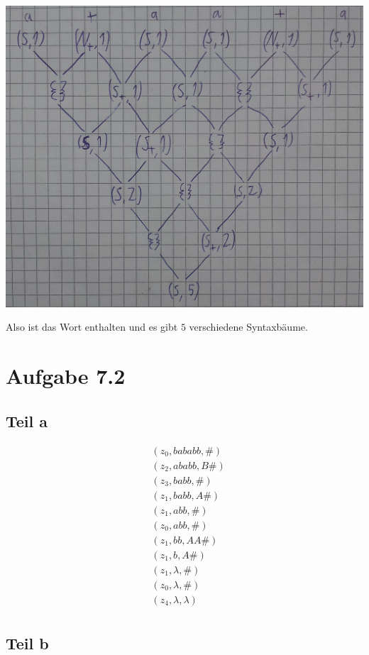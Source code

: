 \documentclass[10pt,a4paper]{article}
\begin{document}
\includegraphics[width=400pt]{7_1_b.png}

Also ist das Wort enthalten und es gibt $5$ verschiedene Syntaxbäume.

\section{Aufgabe 7.2}

\subsection{Teil a}

\begin{align*}
  & (z_{0}, bababb, \#)\\
  & (z_{2}, ababb, B\#)\\
  & (z_{3}, babb, \#)\\
  & (z_{1}, babb, A\#)\\
  & (z_{1}, abb, \#)\\
  & (z_{0}, abb, \#)\\
  & (z_{1}, bb, AA\#)\\
  & (z_{1}, b, A\#)\\
  & (z_{1}, \lambda, \#)\\
  & (z_{0}, \lambda, \#)\\
  & (z_{4}, \lambda, \lambda)\\
\end{align*}

\subsection{Teil b}
\end{document}
